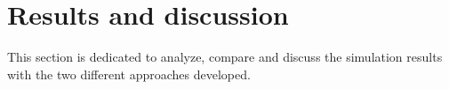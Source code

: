 \section{Results and discussion}
This section is dedicated to analyze, compare and discuss the simulation results with the two different approaches developed.